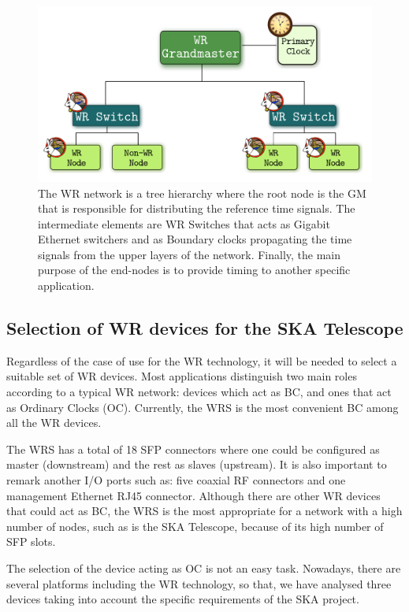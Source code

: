 \begin{figure}[H]
	\centering
	\includegraphics[scale=0.4]{img/wr_hierarchy}
	\caption{The WR network is a tree hierarchy where the root node is the GM that is responsible for distributing the reference time signals. The intermediate elements are WR Switches that acts as Gigabit Ethernet switchers and as Boundary clocks propagating the time signals from the upper layers of the network. Finally, the main purpose of the end-nodes is to provide timing to another specific application.}
	\label{fig:wr_hierarchy}
\end{figure}

\subsection{Selection of WR devices for the SKA Telescope} 
\label{subsec:wr-dev}

Regardless of the case of use for the WR technology, it will be needed to 
select a suitable set of WR devices. Most applications distinguish two main 
roles according to a typical WR network: devices which act as BC, and ones 
that act as Ordinary Clocks (OC). Currently, the WRS \cite{ohwr:wrs} is the 
most convenient BC among all the WR devices. 

The WRS has a total of 18 SFP connectors where one could be configured as 
master (downstream) and the rest as slaves (upstream). It is also important to 
remark another I/O ports such as: five coaxial RF connectors and one management 
Ethernet RJ45 connector. Although there are other WR devices that could act as 
BC, the WRS is the most appropriate for a network with a high number of nodes, 
such as is the SKA Telescope, because of its high number of SFP slots.

The selection of the device acting as OC is not an easy task. Nowadays, there are
several platforms including the WR technology, so that, we have analysed three devices 
taking into account the specific requirements of the SKA project.

